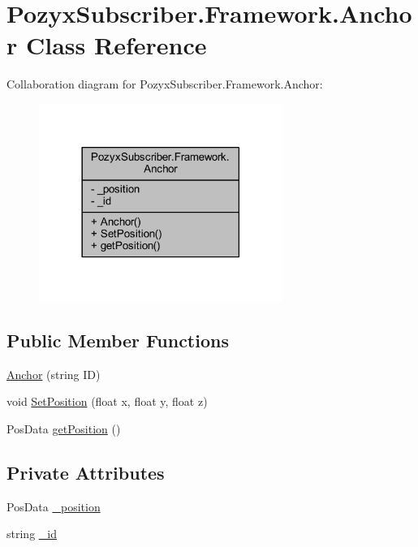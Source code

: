 \hypertarget{class_pozyx_subscriber_1_1_framework_1_1_anchor}{}\section{Pozyx\+Subscriber.\+Framework.\+Anchor Class Reference}
\label{class_pozyx_subscriber_1_1_framework_1_1_anchor}


Collaboration diagram for Pozyx\+Subscriber.\+Framework.\+Anchor\+:
\nopagebreak
\begin{figure}[H]
\begin{center}
\leavevmode
\includegraphics[width=225pt]{class_pozyx_subscriber_1_1_framework_1_1_anchor__coll__graph}
\end{center}
\end{figure}
\subsection*{Public Member Functions}
\begin{DoxyCompactItemize}
\item 
\hyperlink{class_pozyx_subscriber_1_1_framework_1_1_anchor_af3383b1c654f08e99fd5fd42a522b1b7}{Anchor} (string ID)
\item 
void \hyperlink{class_pozyx_subscriber_1_1_framework_1_1_anchor_a7a7f74dc8d89d8ec6bbd5f155fce5850}{Set\+Position} (float x, float y, float z)
\item 
Pos\+Data \hyperlink{class_pozyx_subscriber_1_1_framework_1_1_anchor_aa62fb67e660b0a83467bca1e8a523607}{get\+Position} ()
\end{DoxyCompactItemize}
\subsection*{Private Attributes}
\begin{DoxyCompactItemize}
\item 
Pos\+Data \hyperlink{class_pozyx_subscriber_1_1_framework_1_1_anchor_ac316ecc8136e9a3081a847c41854e67a}{\+\_\+position}
\item 
string \hyperlink{class_pozyx_subscriber_1_1_framework_1_1_anchor_a2bd63c7b8f0f8d466e6e4da6a1d89cab}{\+\_\+id}
\end{DoxyCompactItemize}


